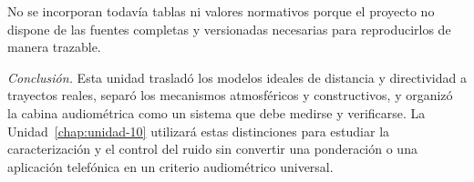  No se incorporan todavía tablas ni valores normativos porque
el proyecto no dispone de las fuentes completas y versionadas necesarias para
reproducirlos de manera trazable.

\bigskip
\noindent\emph{Conclusión.} Esta unidad trasladó los modelos ideales de
distancia y directividad a trayectos reales, separó los mecanismos atmosféricos
y constructivos, y organizó la cabina audiométrica como un sistema que debe
medirse y verificarse. La Unidad~\ref{chap:unidad-10} utilizará estas
distinciones para estudiar
la caracterización y el control del ruido sin convertir una ponderación o una
aplicación telefónica en un criterio audiométrico universal.

